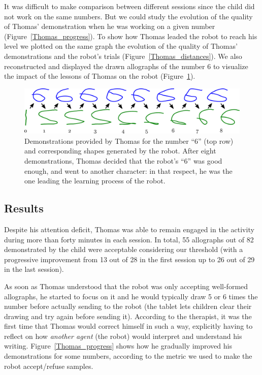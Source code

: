 \documentclass[conference]{IEEEtran}
\begin{document}
It was difficult to make comparison between different sessions since the child did not work on the same numbers. But we could study the evolution of the quality of Thomas' demonstration when he was working on a given number (Figure~\ref{Thomas_progress}).
To show how Thomas leaded the robot to reach his level we plotted on the same graph the evolution of the quality of Thomas' demonstrations and the robot's trials (Figure~\ref{Thomas_distances}). We also reconstructed and displayed the drawn allographs of the number 6 to visualize the impact of the lessons of Thomas on the robot (Figure~\ref{learning_6_demos}). 

\begin{figure}
    \centering
    \includegraphics[width=0.9\linewidth]{learning_6_demos}
    \caption{\small Demonstrations provided by Thomas for the number ``6'' (top row) and
        corresponding shapes generated by the robot. After eight demonstrations,
        Thomas decided that the robot's ``6'' was good enough, and went to
    another character: in that respect, he was the one leading the learning
process of the robot.}
    \label{learning_6_demos}
\end{figure}

\subsection{Results}
Despite his attention deficit, Thomas was able to remain engaged in the activity during more than
forty minutes in each session. In total, 55 allographs out of 82 
demonstrated by the child were acceptable considering our threshold (with a
progressive improvement from 13 out of 28 in the first session up to 26 out
of 29 in the last session).

As soon as Thomas understood that the robot was only accepting well-formed
allographs, he started to focus on it and he would typically draw 5 or 6 times
the number before actually sending to the robot (the tablet lets children
clear their drawing and try again before sending it). According to
the therapist, it was the first time that Thomas would correct himself in such a
way, explicitly having to reflect on how \emph{another agent} (the robot) would
interpret and understand his writing. Figure~\ref{Thomas_progress} shows how
he gradually improved his demonstrations for some numbers, according to the
metric we used to make the robot accept/refuse samples.
\end{document}
